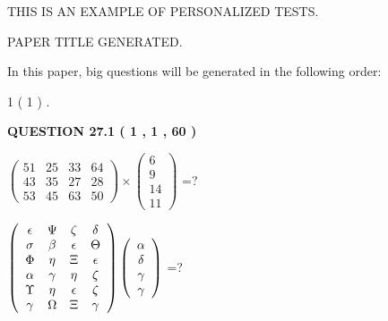 \documentclass[12pt]{article}
\begin{document}
   
   
   
   
   
 \vspace{0.2in}
{\Huge  THIS IS AN EXAMPLE OF}
{\Huge  PERSONALIZED TESTS. }
   
   
 PAPER TITLE GENERATED.
   
   
   
\vspace{0.2in}
   
In this paper, big questions will be generated in the following order: 
   
   
   1 ( 1 )
 .
  
\vspace{0.2in}
  
{\textbf{\Large{QUESTION
27.1 
 ( 1 , 1 , 60 )
}}}
  
  
 
$ \left( \begin{array}{ccccccccc}
 51  & 
 25  & 
 33  & 
 64  \\ 
 43  & 
 35  & 
 27  & 
 28  \\ 
 53  & 
 45  & 
 63  & 
 50
\end{array}\right) \times
\left( \begin{array}{c}
 6  \\ 
 9  \\ 
 14  \\ 
 11
\end{array}\right) $ =?
 
 
$  %
 \left( \begin{array}
 {
 c
 c
 c
 c
 }
 \epsilon & 
 \Psi & 
                    \zeta & 
 \delta \\ 
 \sigma & 
 \beta & 
 \epsilon & 
 \Theta \\ 
 \Phi & 
 \eta & 
                    \Xi & 
 \epsilon \\ 
 \alpha & 
 \gamma & 
 \eta & 
                    \zeta \\ 
 \Upsilon & 
 \eta & 
 \epsilon & 
                    \zeta \\ 
 \gamma & 
 \Omega & 
                    \Xi & 
 \gamma
 \end{array} \right)
 \left( \begin{array}
 {
 c
 }
 \alpha \\ 
 \delta \\ 
 \gamma \\ 
 \gamma
 \end{array} \right)
$ =?
 
 
 
\end{document}
